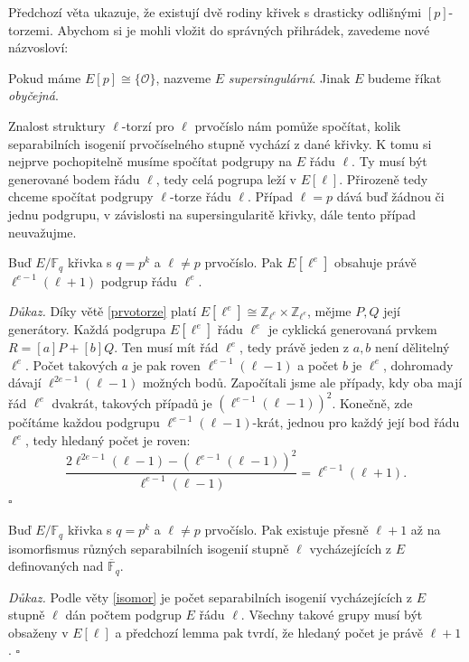 \documentclass[12pt]{report}
\begin{document}
Předchozí věta ukazuje, že existují dvě rodiny křivek s drasticky odlišnými $[p]$-torzemi. Abychom si je mohli vložit do správných přihrádek, zavedeme nové názvosloví:

\begin{definice}
Pokud máme $E[p] \cong \lbrace \mathcal{O} \rbrace $, nazveme $E$ \textit{supersingulární}. Jinak $E$ budeme říkat \textit{obyčejná}.
\end{definice}

Znalost struktury $\ell$-torzí pro $\ell$ prvočíslo nám pomůže spočítat, kolik separabilních isogenií prvočíselného stupně vychází z dané křivky. K tomu si nejprve pochopitelně musíme spočítat podgrupy na $E$ řádu $\ell$. Ty musí být generované bodem řádu $\ell$, tedy celá pogrupa leží v $E[\ell]$. Přirozeně tedy chceme spočítat podgrupy $\ell$-torze řádu $\ell$. Případ $\ell = p$ dává buď žádnou či jednu podgrupu, v závislosti na supersingularitě křivky, dále tento případ neuvažujme.
\begin{lemma}\label{bigl+1}
Buď $E/\mathbb{F}_{q}$ křivka s $q = p^k$ a $\ell \neq p$ prvočíslo. Pak $E[\ell ^e]$ obsahuje právě $\ell^{e-1} (\ell+1)$ podgrup řádu $\ell^e$.
\end{lemma}
\noindent \textit{Důkaz.} Díky větě \ref{prvotorze} platí $E[\ell^e] \cong \mathbb{Z}_{\ell ^e} \times \mathbb{Z}_{\ell ^e}$, mějme $P,Q$ její generátory. Každá podgrupa $E[\ell ^e]$ řádu $\ell^e$ je cyklická generovaná prvkem $R = [a]P+[b]Q$. Ten musí mít řád $\ell^e$, tedy právě jeden z $a,b$ není dělitelný $\ell^e$. Počet takových $a$ je pak roven $\ell^{e-1} (\ell -1)$ a počet $b$ je $\ell^e$, dohromady dávají $\ell^{2e-1} (\ell -1)$ možných bodů. Započítali jsme ale případy, kdy oba mají řád $\ell^e$ dvakrát, takových případů je $(\ell^{e-1} (\ell - 1))^2$. Konečně, zde počítáme každou podgrupu $\ell^{e-1}(\ell-1)$-krát, jednou pro každý její bod řádu $\ell^e$, tedy hledaný počet je roven:
\begin{equation*}
\frac{2 \ell^{2e-1} (\ell - 1) - (\ell^{e-1} (\ell - 1))^2}{\ell^{e-1}(\ell-1)} = \ell^{e-1} (\ell+1).
\end{equation*}
 \hfill $\square$\\

\begin{dusledek}\label{l+1}
Buď $E/\mathbb{F}_{q}$ křivka s $q = p^k$ a $\ell \neq p$ prvočíslo. Pak existuje přesně $\ell+1$ až na isomorfismus různých separabilních isogenií stupně $\ell$ vycházejících z $E$ definovaných nad $\overline{\mathbb{F}}_{q}$.
\end{dusledek}
\noindent \textit{Důkaz.} Podle věty \ref{isomor} je počet separabilních isogenií vycházejících z $E$ stupně $\ell$ dán počtem podgrup $E$ řádu $\ell$. Všechny takové grupy musí být obsaženy v $E[\ell]$ a předchozí lemma pak tvrdí, že hledaný počet je právě $\ell+1$. \hfill $\square$\\
\end{document}
